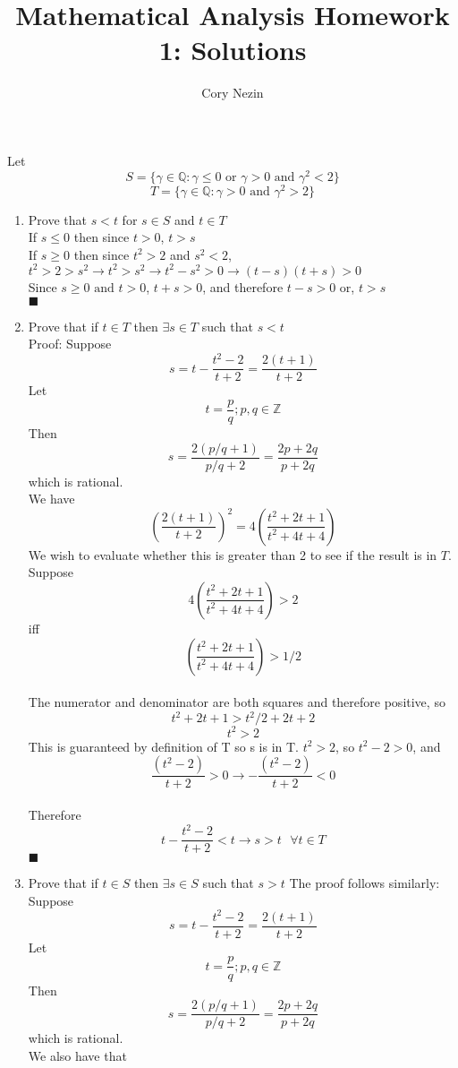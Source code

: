 \documentclass[12pt]{article}
\title{Mathematical Analysis Homework 1: Solutions}
\author{Cory Nezin}
\begin{document}
\maketitle
Let $$ S = \{ \gamma \in \mathbb{Q}: \gamma \leq 0 \text{ or } \gamma > 0
  \text{ and } \gamma^2 < 2\} $$
$$ T = \{ \gamma \in \mathbb{Q}: \gamma > 0 \text{ and } \gamma^2 > 2\} $$
\begin{enumerate}
\item Prove that $ s < t $ for $ s \in S $ and $ t \in T$ \\
If $s \leq 0$ then since $ t > 0 $, $ t > s $\\
If $s \geq 0$ then since $ t^2 > 2 $ and $ s^2 < 2 $, $t^2 > 2 > s^2 \rightarrow
t^2 > s^2 \rightarrow t^2 - s^2 > 0 \rightarrow (t-s)(t+s) > 0$\\
Since $ s \geq 0 \text { and } t > 0$, $t + s > 0$, and therefore $t - s > 0$
or, $ t > s $ \\
$\blacksquare$
\item Prove that if $t \in T$ then $\exists s \in T$ such that  $s < t$\\
Proof:
Suppose $$s = t - \frac{t^2-2}{t+2} = \frac{2(t+1)}{t+2}$$
Let $$ t = \frac{p}{q}; p,q \in \mathbb{Z}$$
Then
$$ s = \frac{2(p/q + 1)}{p/q + 2} = \frac{2p + 2q}{p + 2q} $$
which is rational. \\
We have 
$$ \left(\frac{2(t+1)}{t+2}\right)^2 = 4\left(\frac{t^2 + 2t + 1}{t^2 + 4t + 4}\right)$$
We wish to evaluate whether this is greater than 2 to see if the result is in $T$.
Suppose
$$ 4\left(\frac{t^2 + 2t + 1}{t^2 + 4t + 4}\right) > 2$$
iff
$$ \left(\frac{t^2 + 2t + 1}{t^2 + 4t + 4}\right) > 1/2$$\\
The numerator and denominator are both squares and therefore positive, so
$$ t^2 + 2t + 1 > t^2/2 + 2t + 2$$
$$ t^2 > 2$$
This is guaranteed by definition of T so s is in T.
$ t^2 > 2 $, so $ t^2 - 2 > 0$, and \\
$$ \frac{(t^2-2)}{t+2} > 0 \rightarrow -\frac{(t^2-2)}{t+2} < 0$$\\
Therefore
$$ t - \frac{t^2-2}{t+2} < t \rightarrow s > t \text{ } \forall t \in T$$
$\blacksquare$\\
\item Prove that if $t \in S$ then $\exists s \in S$ such that  $s > t$
The proof follows similarly:
Suppose $$s = t - \frac{t^2-2}{t+2} = \frac{2(t+1)}{t+2}$$
Let $$ t = \frac{p}{q}; p,q \in \mathbb{Z}$$
Then
$$ s = \frac{2(p/q + 1)}{p/q + 2} = \frac{2p + 2q}{p + 2q} $$
which is rational. \\ 
We also have that 

\end{enumerate}
\end{document}
